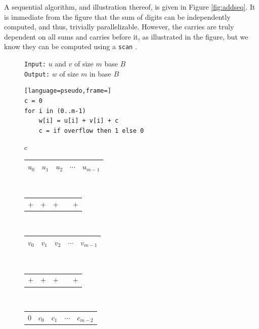 A sequential algorithm, and illustration thereof, is given in Figure
\ref{fig:addseq}. It is immediate from the figure that the sum of digits can be
independently computed, and thus, trivially parallelizable. However, the carries
are truly dependent on all sums and carries before it, as illustrated in the
figure, but we know they can be computed using a \texttt{scan}
\cite{blellochaddscan}.

\begin{figure}
  \centering
  \begin{minipage}{0.45\textwidth}
    \small
    \texttt{Input:} $u$ and $v$ of size $m$ base $B$\\
    \texttt{Output:} $w$ of size $m$ in base $B$
\begin{lstlisting}[language=pseudo,frame=]
c = 0
for i in (0..m-1)
    w[i] = u[i] + v[i] + c
    c = if overflow then 1 else 0
\end{lstlisting}
  \end{minipage}
  \begin{minipage}{0.45\textwidth}
    \centering
    \footnotesize
    \begin{tabular}{c}
      \begin{tabular}{|C{0.7cm}|C{0.7cm}|C{0.7cm}|C{0.7cm}|C{0.7cm}|}
        \hline
        $u_0$ & $u_1$ & $u_2$ & $\cdots$ & $u_{m-1}$\\ 
        \hline
      \end{tabular}\\
      \begin{tabular}{C{0.7cm}C{0.7cm}C{0.7cm}C{0.7cm}C{0.7cm}}
        $+$ & $+$ & $+$ & & $+$\\ 
      \end{tabular}\\
      \begin{tabular}{|C{0.7cm}|C{0.7cm}|C{0.7cm}|C{0.7cm}|C{0.7cm}|}
        \hline
        $v_0$ & $v_1$ & $v_2$ & $\cdots$ & $v_{m-1}$\\
        \hline
      \end{tabular}\\
      \begin{tabular}{C{0.7cm}C{0.7cm}C{0.7cm}C{0.7cm}C{0.7cm}}
        $+$ & $+$ & $+$ &  & $+$\\
      \end{tabular}\\
      \begin{tabular}{C{0.7cm}C{0.7cm}C{0.7cm}C{0.7cm}C{0.7cm}}
        $0$ & $c_0$ &  $c_1$ & $\cdots$ &$c_{m-2}$ \\

\end{tabular}
\end{tabular}
\end{minipage}
\end{figure}
